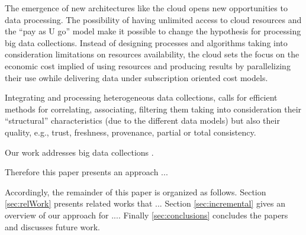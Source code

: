 The emergence of new architectures like the cloud opens new opportunities to data processing. 
The possibility of having unlimited access to cloud resources and the ``pay as U go'' model make it possible to change the hypothesis for processing big  data collections. 
Instead of designing processes and algorithms taking into consideration  limitations on resources availability, the cloud sets the focus on the economic cost implied of using resources and producing results by parallelizing their use owhile delivering data under subscription oriented cost models.
 
Integrating and processing heterogeneous data collections, calls for efficient methods for correlating, associating, filtering them taking into consideration their ``structural'' characteristics (due to the different data models) but also their quality, e.g., trust, freshness, provenance, partial or total consistency. 


Our work addresses big data collections .  

Therefore this paper presents an approach ...

Accordingly, the remainder of this paper is organized as follows. Section \ref{sec:relWork} presents related works that ... Section \ref{sec:incremental} gives an overview of our approach for .... 
Finally \ref{sec:conclusions} concludes the papers and discusses future work.